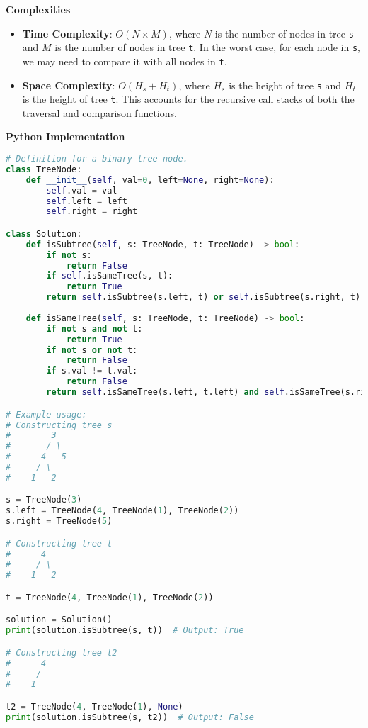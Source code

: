 \textbf{Complexities}

\begin{itemize}
    \item \textbf{Time Complexity}: \(O(N \times M)\), where \(N\) is the number of nodes in tree \texttt{s} and \(M\) is the number of nodes in tree \texttt{t}. In the worst case, for each node in \texttt{s}, we may need to compare it with all nodes in \texttt{t}.
    \item \textbf{Space Complexity}: \(O(H_s + H_t)\), where \(H_s\) is the height of tree \texttt{s} and \(H_t\) is the height of tree \texttt{t}. This accounts for the recursive call stacks of both the traversal and comparison functions.
\end{itemize}

\textbf{Python Implementation}

\begin{lstlisting}[language=Python, xleftmargin=0.02\textwidth, xrightmargin=0.02\textwidth]
# Definition for a binary tree node.
class TreeNode:
    def __init__(self, val=0, left=None, right=None):
        self.val = val
        self.left = left
        self.right = right

class Solution:
    def isSubtree(self, s: TreeNode, t: TreeNode) -> bool:
        if not s:
            return False
        if self.isSameTree(s, t):
            return True
        return self.isSubtree(s.left, t) or self.isSubtree(s.right, t)
    
    def isSameTree(self, s: TreeNode, t: TreeNode) -> bool:
        if not s and not t:
            return True
        if not s or not t:
            return False
        if s.val != t.val:
            return False
        return self.isSameTree(s.left, t.left) and self.isSameTree(s.right, t.right)

# Example usage:
# Constructing tree s
#        3
#       / \
#      4   5
#     / \
#    1   2

s = TreeNode(3)
s.left = TreeNode(4, TreeNode(1), TreeNode(2))
s.right = TreeNode(5)

# Constructing tree t
#      4
#     / \
#    1   2

t = TreeNode(4, TreeNode(1), TreeNode(2))

solution = Solution()
print(solution.isSubtree(s, t))  # Output: True

# Constructing tree t2
#      4
#     / 
#    1   

t2 = TreeNode(4, TreeNode(1), None)
print(solution.isSubtree(s, t2))  # Output: False
\end{lstlisting}

